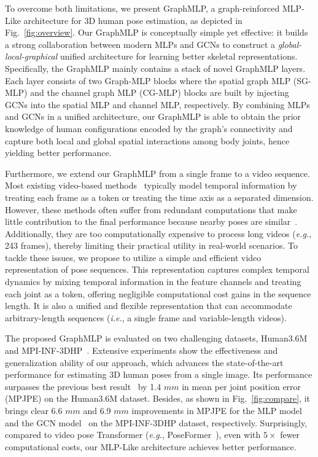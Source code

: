 \documentclass[lettersize,journal]{IEEEtran}
\begin{document}
To overcome both limitations, we present GraphMLP, a graph-reinforced MLP-Like architecture for 3D human pose estimation, as depicted in Fig.~\ref{fig:overview}. 
Our GraphMLP is conceptually simple yet effective: it builds a strong collaboration between modern MLPs and GCNs to construct a \textit{global-local-graphical} unified architecture for learning better skeletal representations. 
Specifically, the GraphMLP mainly contains a stack of novel GraphMLP layers. 
Each layer consists of two Graph-MLP blocks where the spatial graph MLP (SG-MLP) and the channel graph MLP (CG-MLP) blocks are built by injecting GCNs into the spatial MLP and channel MLP, respectively. 
By combining MLPs and GCNs in a unified architecture, our GraphMLP is able to obtain the prior knowledge of human configurations encoded by the graph’s connectivity and capture both local and global spatial interactions among body joints, hence yielding better performance.

Furthermore, we extend our GraphMLP from a single frame to a video sequence. 
Most existing video-based methods~\cite{videopose,poseformer,mhformer} typically model temporal information by treating each frame as a token or treating the time axis as a separated dimension. 
However, these methods often suffer from redundant computations that make little contribution to the final performance because nearby poses are similar~\cite{strided}.
Additionally, they are too computationally expensive to process long videos (\emph{e.g.}, 243 frames), thereby limiting their practical utility in real-world scenarios. 
To tackle these issues, we propose to utilize a simple and efficient video representation of pose sequences.  
This representation captures complex temporal dynamics by mixing temporal information in the feature channels and treating each joint as a token, offering negligible computational cost gains in the sequence length. 
It is also a unified and flexible representation that can accommodate arbitrary-length sequences (\emph{i.e.}, a single frame and variable-length videos). 

The proposed GraphMLP is evaluated on two challenging datasets, Human3.6M~\cite{ionescu2013human3} and MPI-INF-3DHP~\cite{mehta2017monocular}. 
Extensive experiments show the effectiveness and generalization ability of our approach, which advances the state-of-the-art performance for estimating 3D human poses from a single image.  
Its performance surpasses the previous best result~\cite{zou2021modulated} by 1.4 $mm$ in mean per joint position error (MPJPE) on the Human3.6M dataset. 
Besides, as shown in Fig.~\ref{fig:compare}, it brings clear 6.6 $mm$ and 6.9 $mm$ improvements in MPJPE for the MLP model~\cite{mlpmixer} and the GCN model~\cite{stgcn} on the MPI-INF-3DHP dataset, respectively. 
Surprisingly, compared to video pose Transformer (\emph{e.g.}, PoseFormer~\cite{poseformer}), even with $5\times$ fewer computational costs, our MLP-Like architecture achieves better performance. 
\end{document}
